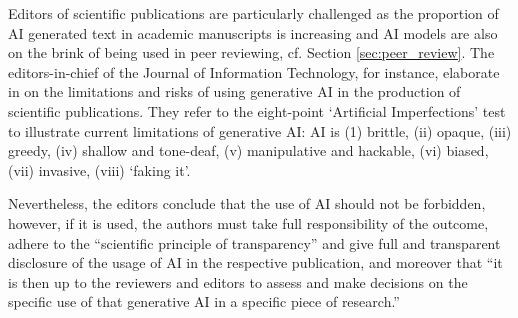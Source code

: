 Editors of scientific publications are particularly challenged as the proportion of AI generated text in academic manuscripts is  increasing   \cite{gray2024chatgptcontaminationestimatingprevalence, kobak2024delving, liang2024mapping, cheng2024have} and AI models are also on the brink of being used in peer reviewing, cf. Section \ref{sec:peer_review}. The editors-in-chief of the Journal of Information Technology, for instance, elaborate in \cite{schlagwein2023chatgpt} on the limitations and risks of using generative AI in the production of scientific publications. They refer to the eight-point ‘Artificial Imperfections’ test to illustrate current limitations of generative AI: %
AI is (1) brittle, (ii) opaque, (iii) greedy, (iv) shallow and tone-deaf, (v) manipulative and hackable, (vi) biased, (vii) invasive, (viii) `faking it'.  
\iffalse 
\begin{itemize}
\item	AI is brittle. It provides only narrow and non-human ‘intelligence’.
\item	AI is opaque. Its inner workings are black-boxed.
\item	AI is greedy. It requires large data training sets as well as processing power, memory and energy.
\item	AI is shallow and tone-deaf. It produces decisions and knowledge claims without understanding, feeling, empathising, seeing, creating, reflecting or even learning in any human sense of these terms.
\item	AI is manipulative and hackable. The digitalisation of many decisions makes them amenable to manipulation by corporations and governments at scale, or open to hacking by malicious actors.
\item	AI is biased. It is inherently biased in that it encodes and enshrines any biases found in the training data.
\item	AI is invasive. It commoditises private data.
\item	AI is faking it. It is ‘bullshitting-as-a-service’. AI is not creative; it fakes creativity. It is not emotional; it fakes emotions, etc.
\end{itemize}
\fi 
Nevertheless, the editors conclude that the use of AI should not be forbidden, however, if it is used, the authors must take full responsibility of the outcome, adhere to the “scientific principle of transparency” and give full and transparent disclosure of the usage of AI in the respective publication, and moreover that “it is then up to the reviewers and editors to assess and make decisions on the specific use of that generative AI in a specific piece of research.”
